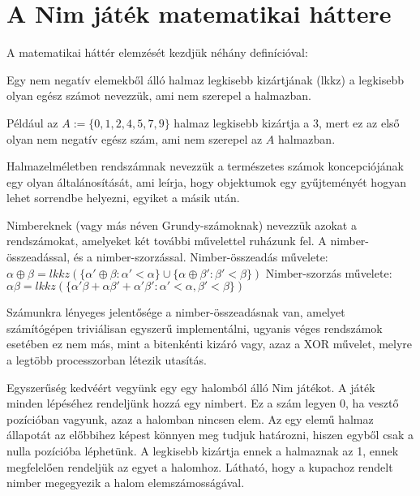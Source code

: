 \section{A Nim játék matematikai háttere}
A matematikai háttér elemzését kezdjük néhány definícióval:

\begin{definition}
	Egy nem negatív elemekből álló halmaz legkisebb kizártjának (lkkz) a legkisebb olyan egész számot nevezzük, ami nem szerepel a halmazban.
\end{definition}

\begin{example}
	Például az $A:=\{0, 1, 2, 4, 5, 7, 9\}$ halmaz legkisebb kizártja a 3, mert ez az első olyan nem negatív egész szám, ami nem szerepel az $A$ halmazban.
\end{example}

\begin{definition}
	Halmazelméletben rendszámnak nevezzük a természetes számok koncepciójának egy olyan általánosítását, ami leírja, hogy objektumok egy gyűjteményét hogyan lehet sorrendbe helyezni, egyiket a másik után.
\end{definition}

\begin{definition}
	Nimbereknek (vagy más néven Grundy-számoknak) nevezzük azokat a rendszámokat, amelyeket két további művelettel ruházunk fel. A nimber-összeadással, és a nimber-szorzással.\ujsor
	Nimber-összeadás művelete: $\alpha \oplus \beta = lkkz(\{\alpha' \oplus \beta: \alpha' < \alpha\} \cup \{\alpha \oplus \beta': \beta' < \beta \})$\ujsor
	Nimber-szorzás művelete: $\alpha \beta = lkkz(\{\alpha' \beta + \alpha \beta' + \alpha' \beta': \alpha' < \alpha, \beta' <  \beta\})$
\end{definition}

\begin{remark}
	Számunkra lényeges jelentősége a nimber-összeadásnak van, amelyet számítógépen triviálisan egyszerű implementálni, ugyanis véges rendszámok esetében ez nem más, mint a bitenkénti kizáró vagy, azaz a XOR művelet, melyre a legtöbb processzorban létezik utasítás. 
\end{remark}

Egyszerűség kedvéért vegyünk egy egy halomból álló Nim játékot. A játék minden lépéséhez rendeljünk hozzá egy nimbert. Ez a szám legyen 0, ha vesztő pozícióban vagyunk, azaz a halomban nincsen elem. Az egy elemű halmaz állapotát az előbbihez képest könnyen meg tudjuk határozni, hiszen egyből csak a nulla pozícióba léphetünk. A legkisebb kizártja ennek a halmaznak az 1, ennek megfelelően rendeljük az egyet a halomhoz. Látható, hogy a kupachoz rendelt nimber megegyezik a halom elemszámosságával. \ujsor

